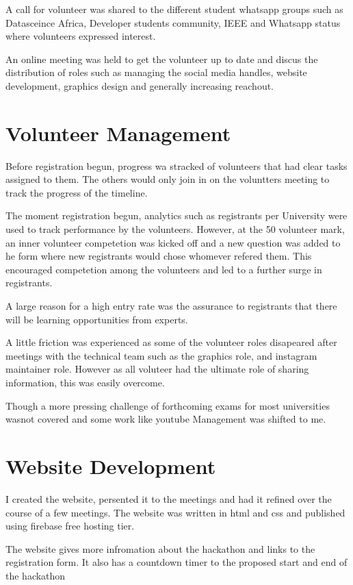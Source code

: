 \documentclass[a4paper,12pt]{report}
\begin{document}
    A call for volunteer was shared to the different student whatsapp groups such as Datasceince Africa, Developer students community, IEEE and Whatsapp status where volunteers expressed interest.
    
    An online meeting was held to get the volunteer up to date and discus the distribution of roles such as managing the social media handles, website development, graphics design and generally increasing reachout.

    \section{Volunteer Management}
    
    Before registration begun, progress wa stracked of volunteers that had clear tasks assigned to them. The others would only join in on the voluntters meeting to track the progress of the timeline.
    
    The moment registration begun, analytics such as registrants per University were used to track performance by  the volunteers. However, at the 50 volunteer mark, an inner volunteer competetion was kicked off and a new question was added to he form where new registrants would chose whomever refered them. This encouraged competetion among the volunteers and led to a further surge in registrants. 

    A large reason for a high entry rate was the assurance to registrants that there will be learning opportunities from experts. 
    
    A little friction was experienced as some of the volunteer roles disapeared after meetings with the technical team such as the graphics role, and instagram maintainer role. However as all voluteer had the ultimate role of sharing information, this was easily overcome.

    Though a more pressing challenge of forthcoming exams for most universities wasnot covered and some work like youtube Management was shifted to me.


    \section{Website Development}
    I created the website, persented it to the meetings and had it refined over the course of a few meetings. The website was written in html and css and published using firebase free hosting tier.

    The website gives more infromation about the hackathon and links to the registration form. It also has a countdown timer to the proposed start and end of the hackathon
\end{document}
